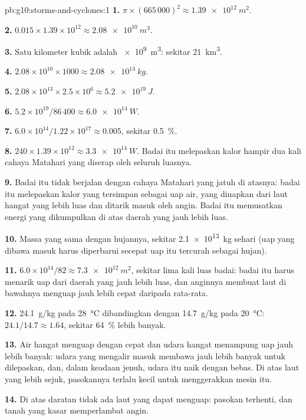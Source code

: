 \begin{solution}{pb:g10:storms-and-cyclones:1}
\textbf{1.} $\pi \times (665\,000)^2 \approx \qty{1.39e12}{m^2}$.

\textbf{2.} $0.015 \times 1.39\times10^{12} \approx \qty{2.08e10}{m^3}$.

\textbf{3.} Satu kilometer kubik adalah \qty{e9}{m^3}: sekitar \qty{21}{km^3}.

\textbf{4.} $2.08\times10^{10} \times 1000 \approx \qty{2.08e13}{kg}$.

\textbf{5.} $2.08\times10^{13} \times 2.5\times10^6 \approx \qty{5.2e19}{J}$.

\textbf{6.} $5.2\times10^{19}/86\,400 \approx \qty{6.0e14}{W}$.

\textbf{7.} $6.0\times10^{14}/1.22\times10^{17} \approx 0.005$, sekitar
\qty{0.5}{\percent}.

\textbf{8.} $240 \times 1.39\times10^{12} \approx \qty{3.3e14}{W}$. Badai itu
melepaskan kalor hampir dua kali cahaya Matahari yang diserap oleh seluruh
luasnya.

\textbf{9.} Badai itu tidak berjalan dengan cahaya Matahari yang jatuh di
atasnya: badai itu melepaskan kalor yang tersimpan sebagai uap air, yang
diuapkan dari laut hangat yang lebih luas dan ditarik masuk oleh angin. Badai
itu memusatkan energi yang dikumpulkan di atas daerah yang jauh lebih luas.

\textbf{10.} Massa yang sama dengan hujannya, sekitar \qty{2.1e13}{kg} sehari
(uap yang dibawa masuk harus diperbarui secepat uap itu tercurah sebagai
hujan).

\textbf{11.} $6.0\times10^{14}/82 \approx \qty{7.3e12}{m^2}$, sekitar lima kali
luas badai: badai itu harus menarik uap dari daerah yang jauh lebih luas, dan
anginnya membuat laut di bawahnya menguap jauh lebih cepat daripada rata-rata.

\textbf{12.} \qty{24.1}{g/kg} pada \qty{28}{\degreeCelsius} dibandingkan
dengan \qty{14.7}{g/kg} pada \qty{20}{\degreeCelsius}:
$24.1/14.7 \approx 1.64$, sekitar \qty{64}{\percent} lebih banyak.

\textbf{13.} Air hangat menguap dengan cepat dan udara hangat menampung uap
jauh lebih banyak: udara yang mengalir masuk membawa jauh lebih banyak  untuk dilepaskan, dan, dalam keadaan jenuh, udara itu naik dengan bebas.
Di atas laut yang lebih sejuk, pasokannya terlalu kecil untuk menggerakkan
mesin itu.

\textbf{14.} Di atas daratan tidak ada laut yang dapat menguap: pasokan  terhenti, dan tanah yang kasar memperlambat angin.


\end{solution}
